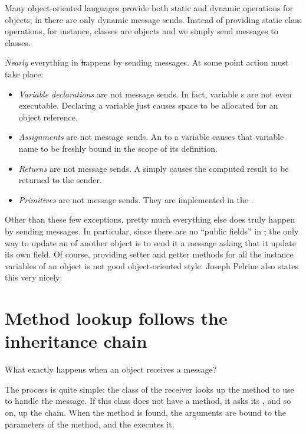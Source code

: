 \documentclass[a4paper,10pt,twoside]{book}
\begin{document}
Many object-oriented languages provide both static and dynamic operations for objects; in \st there are only dynamic message sends. Instead of providing static class operations, for instance, classes are objects and we simply send messages to classes.

\emph{Nearly} everything in \st happens by sending messages.
At some point action must take place:
\begin{itemize}
  \item \emph{Variable declarations} are not message sends.
  		In fact, variable s are not even executable.
  		Declaring a variable just causes space to be allocated for an object reference.
  \item \emph{Assignments} are not message sends.
  		An  to a variable causes that variable name to be freshly bound in the scope of its definition.
  \item \emph{Returns} are not message sends.
  		A  simply causes the computed result to be returned to the sender.
  \item \emph{Primitives} are not message sends.
  		They are implemented in the .
\end{itemize}
Other than these few exceptions, pretty much everything else does truly happen by sending messages.
In particular, since there are no ``public fields'' in \st, the only way to update an  of another object is to send it a message asking that it update its own field.
Of course, providing setter and getter methods for all the instance variables of an object is not good object-oriented style.
Joseph Pelrine also states this very nicely:

\section{Method lookup follows the inheritance chain} 


What exactly happens when an object receives a message?

The process is quite simple:
the class of the receiver looks up the method to use to handle the message.
If this class does not have a method, it asks its , and so on, up the  chain.
When the method is found, the arguments are bound to the parameters of the method, and the  executes it.
\end{document}
